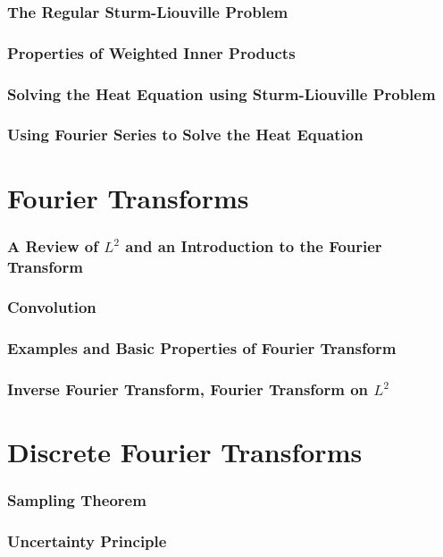 \section{The Regular Sturm-Liouville Problem}

\section{Properties of Weighted Inner Products}

\section{Solving the Heat Equation using Sturm-Liouville Problem}

\section{Using Fourier Series to Solve the Heat Equation}

\part{Fourier Transforms}
\section{A Review of $L^{2}$ and an Introduction to the Fourier Transform}

\section{Convolution}


\section{Examples and Basic Properties of Fourier Transform}

\section{Inverse Fourier Transform, Fourier Transform on $L^2$}


\part{Discrete Fourier Transforms}
\section{Sampling Theorem}

\section{Uncertainty Principle}

%
%
%
%
\nocite{morseVolOne}
\nocite{textbook}
